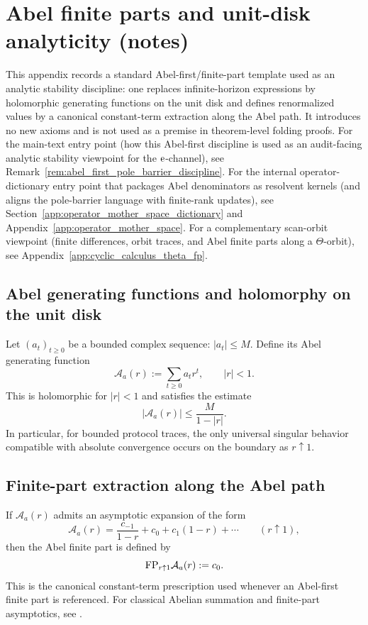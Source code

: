 \section{Abel finite parts and unit-disk analyticity (notes)}
\label{app:abel_finite_part_notes}

\AuditTag This appendix records a standard Abel-first/finite-part template used as an analytic stability discipline: one replaces infinite-horizon expressions by holomorphic generating functions on the unit disk and defines renormalized values by a canonical constant-term extraction along the Abel path.
It introduces no new axioms and is not used as a premise in theorem-level folding proofs.
For the main-text entry point (how this Abel-first discipline is used as an audit-facing analytic stability viewpoint for the $\mathrm{e}$-channel), see Remark~\ref{rem:abel_first_pole_barrier_discipline}.
\AuditTag For the internal operator-dictionary entry point that packages Abel denominators as resolvent kernels (and aligns the pole-barrier language with finite-rank updates), see Section~\ref{app:operator_mother_space_dictionary} and Appendix~\ref{app:operator_mother_space}.
\AuditTag For a complementary scan-orbit viewpoint (finite differences, orbit traces, and Abel finite parts along a $\Theta$-orbit), see Appendix~\ref{app:cyclic_calculus_theta_fp}.

\subsection{Abel generating functions and holomorphy on the unit disk}
\label{subsec:abel_holomorphy}

Let $(a_t)_{t\ge 0}$ be a bounded complex sequence: $|a_t|\le M$.
Define its Abel generating function
\[
\mathcal{A}_a(r):=\sum_{t\ge 0} a_t r^t,\qquad |r|<1.
\]
\MathTag This is holomorphic for $|r|<1$ and satisfies the estimate
\[
|\mathcal{A}_a(r)|\le \frac{M}{1-|r|}.
\]
In particular, for bounded protocol traces, the only universal singular behavior compatible with absolute convergence occurs on the boundary as $r\uparrow 1$.

\subsection{Finite-part extraction along the Abel path}
\label{subsec:abel_finite_part_def}

If $\mathcal{A}_a(r)$ admits an asymptotic expansion of the form
\[
\mathcal{A}_a(r)=\frac{c_{-1}}{1-r}+c_0+c_1(1-r)+\cdots
\qquad (r\uparrow 1),
\]
then the Abel finite part is defined by
\[
\mathrm{FP}_{r\uparrow 1}\mathcal{A}_a(r):=c_0.
\]
This is the canonical constant-term prescription used whenever an Abel-first finite part is referenced.
For classical Abelian summation and finite-part asymptotics, see \cite{Hardy1949,EstradaKanwal2002}.


